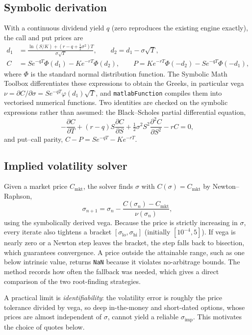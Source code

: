 \documentclass[11pt]{article}
\newcommand{\IV}{\sigma_{\mathrm{imp}}}
\begin{document}
\subsection{Symbolic derivation}
With a continuous dividend yield $q$ (zero reproduces the existing engine exactly), the call and put prices are
\begin{align}
  d_1 &= \frac{\ln(S/K) + (r - q + \tfrac12\sigma^2)T}{\sigma\sqrt{T}}, \qquad d_2 = d_1 - \sigma\sqrt{T},\\
  C &= S e^{-qT}\Phi(d_1) - K e^{-rT}\Phi(d_2), \qquad
  P = K e^{-rT}\Phi(-d_2) - S e^{-qT}\Phi(-d_1),
\end{align}
where $\Phi$ is the standard normal distribution function. The Symbolic Math Toolbox differentiates these expressions to obtain the Greeks, in particular vega $\nu = \partial C/\partial\sigma = S e^{-qT}\varphi(d_1)\sqrt{T}$, and \texttt{matlabFunction} compiles them into vectorised numerical functions. Two identities are checked on the symbolic expressions rather than assumed: the Black--Scholes partial differential equation,
\begin{equation}
  -\frac{\partial C}{\partial T} + (r-q)S\frac{\partial C}{\partial S} + \tfrac12\sigma^2 S^2\frac{\partial^2 C}{\partial S^2} - rC = 0,
\end{equation}
and put--call parity, $C - P = Se^{-qT} - Ke^{-rT}$.

\subsection{Implied volatility solver}
Given a market price $C_{\mathrm{mkt}}$, the solver finds $\sigma$ with $C(\sigma) = C_{\mathrm{mkt}}$ by Newton--Raphson,
\begin{equation}
  \sigma_{n+1} = \sigma_n - \frac{C(\sigma_n) - C_{\mathrm{mkt}}}{\nu(\sigma_n)},
\end{equation}
using the symbolically derived vega. Because the price is strictly increasing in $\sigma$, every iterate also tightens a bracket $[\sigma_{\mathrm{lo}},\sigma_{\mathrm{hi}}]$ (initially $[10^{-4},5]$). If vega is nearly zero or a Newton step leaves the bracket, the step falls back to bisection, which guarantees convergence. A price outside the attainable range, such as one below intrinsic value, returns \texttt{NaN} because it violates no-arbitrage bounds. The method records how often the fallback was needed, which gives a direct comparison of the two root-finding strategies.

A practical limit is \emph{identifiability}: the volatility error is roughly the price tolerance divided by vega, so deep in-the-money and short-dated options, whose prices are almost independent of $\sigma$, cannot yield a reliable $\IV$. This motivates the choice of quotes below.
\end{document}
